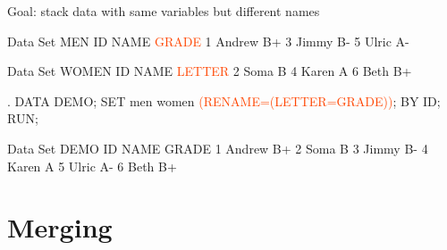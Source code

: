 \begin{frame}[fragile]
\bi
\item[Goal:] stack data with same variables but different names
\ei
{}
\footnotesize
\begin{craw}{.1}{Data Set MEN}
ID   NAME     \textcolor{OrangeRed}{GRADE}
1    Andrew     B+
3    Jimmy      B-
5    Ulric      A-
\end{craw}
\vspace{.0in}
\begin{craw}{.1}{Data Set WOMEN}
ID   NAME     \textcolor{OrangeRed}{LETTER}
2    Soma       B
4    Karen      A
6    Beth       B+
\end{craw}
\vspace{.0in}
\emp
{}
\begin{code}{.}
DATA DEMO;
SET men
  women \textcolor{OrangeRed}{(RENAME=(LETTER=GRADE))};
BY ID;
RUN;
\end{code}
\vspace{.0in}
\begin{craw}{.1}{Data Set DEMO}
ID   NAME     GRADE
1    Andrew     B+
2    Soma       B
3    Jimmy      B-
4    Karen      A
5    Ulric      A-
6    Beth       B+
\end{craw}
\emp
\vspace{.0in}
\end{frame}







\section[Merging]{Merging}
\subsection{}
\begin{frame}
\end{frame}


